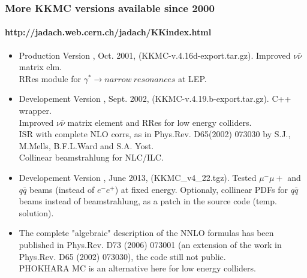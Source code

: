 \documentclass{beamer}
\newcommand{\cbl}{\color{blue}}
\newcommand{\cmg}{\color{magenta}}
\begin{document}
\begin{frame}[fragile]
\frametitle{\bf More KKMC versions available since 2000}
\framesubtitle{http://jadach.web.cern.ch/jadach/KKindex.html}
\small
\begin{itemize}
\item
Production Version \fbox{\cmg 4.16}, Oct. 2001,  
(KKMC-v.4.16d-export.tar.gz).
Improved $\nu\bar{\nu}$ matrix elm.\\
RRes module for $\gamma^* \to narrow~resonances$ at LEP.
\item
Developement Version \fbox{\cmg 4.19}, Sept. 2002,  
(KKMC-v.4.19.b-export.tar.gz). C++ wrapper.\\
Improved $\nu\bar{\nu}$ matrix element and RRes for low energy colliders.\\
ISR with complete NLO corrs,
as in Phys.Rev. D65(2002) 073030 by S.J., M.Mells, B.F.L.Ward and S.A. Yost.\\
Collinear beamstrahlung for NLC/ILC.
\item
{\cbl
Developement Version \fbox{\cmg 4.22}, June 2013,  
(KKMC\_v4\_22.tgz).
Tested $\mu^-\mu+$ and $q\bar{q}$ beams
(instead of $e^-e^+$) at fixed energy.
Optionaly, collinear PDFs for $q\bar{q}$ beams instead of beamstrahlung,
as a patch in the source code (temp. solution).}
\item
{\footnotesize
The complete "algebraic" description of the NNLO formulas has been
published in Phys.Rev. D73 (2006) 073001
(an extension of the work in Phys.Rev. D65 (2002) 073030),
the code still not public.\\
PHOKHARA MC is an alternative here for low energy colliders.}
\end{itemize}


\end{frame}
\end{document}
